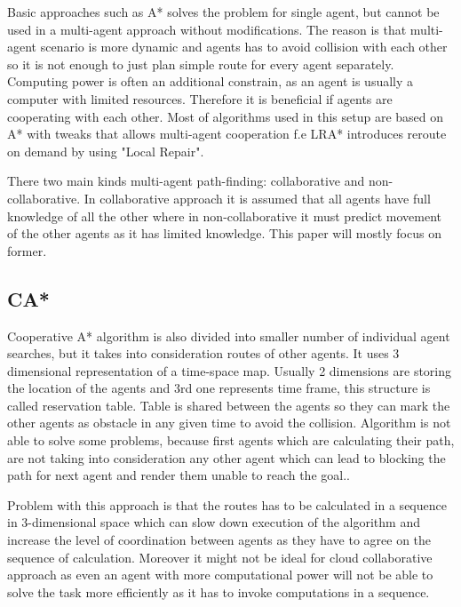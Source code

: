 Basic approaches such as A* solves the problem for single agent, but cannot be used in a multi-agent approach without modifications. The reason is that multi-agent scenario is more dynamic and agents has to avoid collision with each other so it is not enough to just plan simple route for every agent separately. Computing power is often an additional constrain, as an agent is usually a computer with limited resources. Therefore it is beneficial if agents are cooperating with each other. Most of algorithms used in this setup are based on A* with tweaks that allows multi-agent cooperation f.e LRA* introduces reroute on demand by using "Local Repair"\cite{path_adv}.

There two main kinds multi-agent path-finding: collaborative and non-collaborative. In collaborative approach it is assumed that all agents have full knowledge of all the other where in non-collaborative it must predict movement of the other agents as it has limited knowledge. This paper will mostly focus on former.
\subsection{CA*}
Cooperative A* algorithm is also divided into smaller number of individual agent searches, but it takes into consideration routes of other agents. It uses 3 dimensional representation of a time-space map. Usually 2 dimensions are storing the location of the agents and 3rd one represents time frame, this structure is called reservation table. Table is shared between the agents so they can mark the other agents as obstacle in any given time to avoid the collision. Algorithm is not able to solve some problems, because first agents which are calculating their path, are not taking into consideration any other agent which can lead to blocking the path for next agent and render them unable to reach the goal.\cite{path_adv}. 

Problem with this approach is that the routes has to be calculated in a sequence in 3-dimensional space which can slow down execution of the algorithm and increase the level of coordination between agents as they have to agree on the sequence of calculation. Moreover it might not be ideal for cloud collaborative approach as even an agent with more computational power will not be able to solve the task more efficiently as it has to invoke computations in a sequence.
